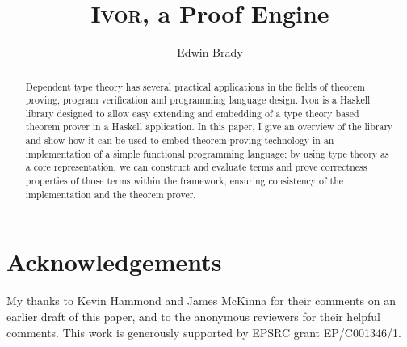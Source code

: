 \documentclass[orivec,dvips,10pt]{llncs}
\newcommand{\Ivor}{\textsc{Ivor}}
\begin{document}
\title{\Ivor{}, a Proof Engine}
\author{Edwin Brady}

 
\maketitle

\begin{abstract}
Dependent type theory has several practical applications in the fields
of theorem proving, program verification and programming language
design. \Ivor{} is a Haskell library designed to allow easy extending
and embedding of a type theory based theorem prover in a Haskell
application. In this paper, I give an overview of the library and show
how it can be used to embed theorem proving technology in an
implementation of a simple functional programming language; by using
type theory as a core representation, we can construct and evaluate
terms and prove correctness properties of those terms within the
 framework, ensuring consistency of the implementation and
the theorem prover. 

\end{abstract}





%







\section*{Acknowledgements}

My thanks to Kevin Hammond and James McKinna for their comments on an
earlier draft of this paper, and to the anonymous reviewers for their
helpful comments.
This work is generously supported by EPSRC grant EP/C001346/1. 


\begin{small}



%

\end{small}
\end{document}
